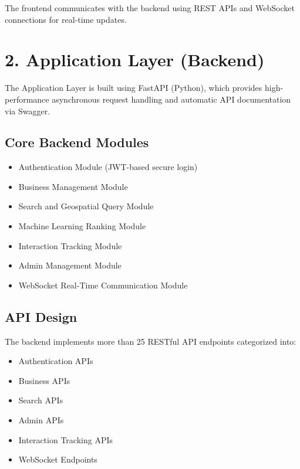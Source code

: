 \documentclass[12pt,a4paper]{report}
\begin{document}
The frontend communicates with the backend using REST APIs and WebSocket connections for real-time updates.

\section{2. Application Layer (Backend)}

The Application Layer is built using FastAPI (Python), which provides high-performance asynchronous request handling and automatic API documentation via Swagger.

\subsection*{Core Backend Modules}

\begin{itemize}

\item Authentication Module (JWT-based secure login)

\item Business Management Module

\item Search and Geospatial Query Module

\item Machine Learning Ranking Module

\item Interaction Tracking Module

\item Admin Management Module

\item WebSocket Real-Time Communication Module

\end{itemize}

\subsection*{API Design}

The backend implements more than 25 RESTful API endpoints categorized into:

\begin{itemize}

\item Authentication APIs

\item Business APIs

\item Search APIs

\item Admin APIs

\item Interaction Tracking APIs

\item WebSocket Endpoints

\end{itemize}
\end{document}
